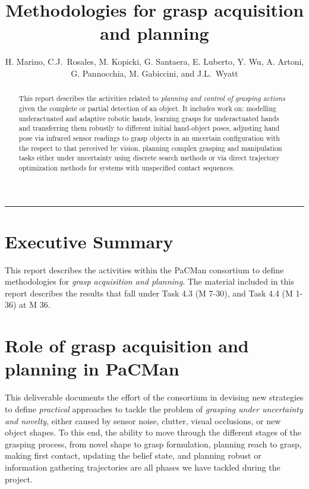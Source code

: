 \documentclass[a4paper,11pt,pdf]{pacmanreport}
\title{Methodologies for grasp acquisition and planning}
\author{H. Marino, C.J.~Rosales, M. Kopicki, G. Santaera, E. Luberto, Y. Wu, A. Artoni, G. Pannocchia, M. Gabiccini, and J.L.~Wyatt}
\begin{document}
\maketitle

\begin{abstract}
\noindent This report describes the activities related to \emph{planning and  control of grasping actions} given the complete or partial detection of an object. It includes work on: modelling underactuated and adaptive robotic hands, learning grasps for underactuated hands and transferring them robustly to different initial hand-object poses, adjusting hand pose via infrared sensor readings to grasp objects in an uncertain configuration with the respect to that perceived by vision, planning complex grasping and manipulation tasks either under uncertainty using discrete search methods or via direct trajectory optimization methods for systems with unspecified contact sequences.
\end{abstract}


\vspace{.2em}
\hrule

\footnotesize

\tableofcontents

\normalsize

\newpage

\section*{Executive Summary}

This report describes the activities within the PaCMan consortium to define methodologies for \emph{grasp acquisition and planning}. The material included in this report describes the results that fall under Task 4.3 (M 7-30), and Task 4.4 (M 1-36) at M 36.

\section*{Role of grasp acquisition and planning in PaCMan}

This deliverable documents the effort of the consortium in devising new strategies to define \emph{practical} approaches to tackle the problem of \emph{grasping under uncertainty and novelty}, either caused by sensor noise, clutter, visual occlusions, or new object shapes. To this end, the ability to move through the different stages of the grasping process, from novel shape to grasp formulation, planning reach to grasp, making first contact, updating the belief state, and planning robust or information gathering trajectories are all phases we have tackled during the project.
\end{document}
